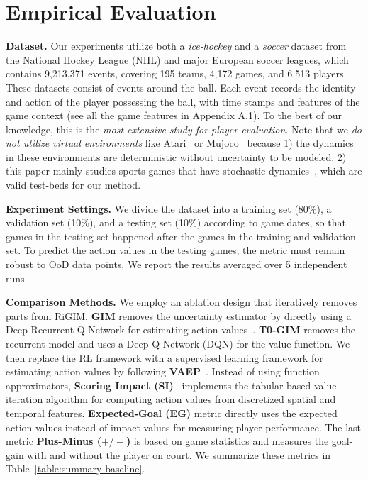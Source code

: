 \documentclass{article}
\newcommand{\sys}{RiGIM}
\newcommand{\system}{\sys\;}
\begin{document}
\section{Empirical Evaluation}\label{Sec:experiment}

\noindent\textbf{Dataset.} 
Our experiments utilize both a {\it ice-hockey} and a {\it soccer} dataset from the National Hockey League (NHL) and major European soccer leagues, which contains 9,213,371 events, covering 195 teams, 4,172 games, and 6,513 players. These datasets consist of events around the ball. Each event records the identity and action of the player possessing the ball, with time stamps and features of the game context (see all the game features in Appendix A.1). To the best of our knowledge, this is the {\it most extensive study for player evaluation}. Note that we {\it do not utilize virtual environments} like Atari~\cite{bellemare2013arcade} or Mujoco~\cite{Todorov2012Mujoco} because 1) the dynamics in these environments are deterministic without uncertainty to be modeled. 2) this paper mainly studies sports games that have stochastic dynamics~\cite{schwartz2017handbook}, which are valid test-beds for our method.

\noindent\textbf{Experiment Settings.} We divide the dataset into a training set (80\%), a validation set (10\%), and a testing set (10\%) according to game dates, so that games in the testing set happened after the games in the training and validation set. To predict the action values in the testing games, the metric must remain robust to OoD data points.
We report the results averaged over 5 independent runs. 

\noindent\textbf{Comparison Methods.} We employ an ablation design that iteratively removes parts from \system.  {\bf GIM} removes the uncertainty estimator by directly using a Deep Recurrent Q-Network for estimating action values~\cite{Liu2018DRL}. {\bf T0-GIM} removes the recurrent model and uses a Deep Q-Network (DQN) for the value function. We then replace the RL framework with a supervised learning framework for estimating action values by following {\bf VAEP}~\cite{Decroos2019Actions}. Instead of using function approximators, {\bf Scoring Impact (SI)}~\cite{Routley2015Markov} implements the tabular-based value iteration algorithm for computing action values from discretized spatial and temporal features. {\bf Expected-Goal (EG)} metric directly uses the expected action values instead of impact values for measuring player performance. The last 
metric {\bf  Plus-Minus ($+/-$)}
is based on game statistics and measures the goal-gain with and without the player on court. We summarize these metrics in Table~\ref{table:summary-baseline}.
\end{document}

